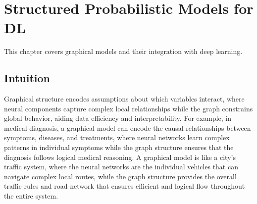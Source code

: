 
\chapter{Structured Probabilistic Models for DL}
\label{chap:structured-probabilistic-models}

This chapter covers graphical models and their integration with deep learning.


\begin{learningobjectives}
\end{learningobjectives}



\section*{Intuition}

Graphical structure encodes assumptions about which variables interact, where neural components capture complex local relationships while the graph constrains global behavior, aiding data efficiency and interpretability. For example, in medical diagnosis, a graphical model can encode the causal relationships between symptoms, diseases, and treatments, where neural networks learn complex patterns in individual symptoms while the graph structure ensures that the diagnosis follows logical medical reasoning. A graphical model is like a city's traffic system, where the neural networks are the individual vehicles that can navigate complex local routes, while the graph structure provides the overall traffic rules and road network that ensures efficient and logical flow throughout the entire system.










